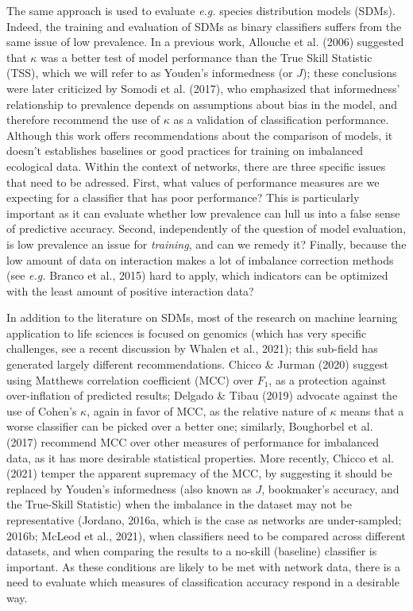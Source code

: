 \documentclass[11pt]{article}
\begin{document}
The same approach is used to evaluate \emph{e.g.} species distribution
models (SDMs). Indeed, the training and evaluation of SDMs as binary
classifiers suffers from the same issue of low prevalence. In a previous
work, Allouche et al. (2006) suggested that \(\kappa\) was a better test
of model performance than the True Skill Statistic (TSS), which we will
refer to as Youden's informedness (or \(J\)); these conclusions were
later criticized by Somodi et al. (2017), who emphasized that
informedness' relationship to prevalence depends on assumptions about
bias in the model, and therefore recommend the use of \(\kappa\) as a
validation of classification performance. Although this work offers
recommendations about the comparison of models, it doesn't establishes
baselines or good practices for training on imbalanced ecological data.
Within the context of networks, there are three specific issues that
need to be adressed. First, what values of performance measures are we
expecting for a classifier that has poor performance? This is
particularly important as it can evaluate whether low prevalence can
lull us into a false sense of predictive accuracy. Second, independently
of the question of model evaluation, is low prevalence an issue for
\emph{training}, and can we remedy it? Finally, because the low amount
of data on interaction makes a lot of imbalance correction methods (see
\emph{e.g.} Branco et al., 2015) hard to apply, which indicators can be
optimized with the least amount of positive interaction data?

In addition to the literature on SDMs, most of the research on machine
learning application to life sciences is focused on genomics (which has
very specific challenges, see a recent discussion by Whalen et al.,
2021); this sub-field has generated largely different recommendations.
Chicco \& Jurman (2020) suggest using Matthews correlation coefficient
(MCC) over \(F_1\), as a protection against over-inflation of predicted
results; Delgado \& Tibau (2019) advocate against the use of Cohen's
\(\kappa\), again in favor of MCC, as the relative nature of \(\kappa\)
means that a worse classifier can be picked over a better one;
similarly, Boughorbel et al. (2017) recommend MCC over other measures of
performance for imbalanced data, as it has more desirable statistical
properties. More recently, Chicco et al. (2021) temper the apparent
supremacy of the MCC, by suggesting it should be replaced by Youden's
informedness (also known as \(J\), bookmaker's accuracy, and the
True-Skill Statistic) when the imbalance in the dataset may not be
representative (Jordano, 2016a, which is the case as networks are
under-sampled; 2016b; McLeod et al., 2021), when classifiers need to be
compared across different datasets, and when comparing the results to a
no-skill (baseline) classifier is important. As these conditions are
likely to be met with network data, there is a need to evaluate which
measures of classification accuracy respond in a desirable way.
\end{document}

